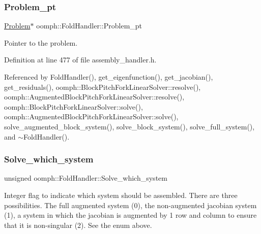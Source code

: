 \mbox{\label{classoomph_1_1FoldHandler_a2bd14323ca059b1aaef045cb9cc4013b}} 
\subsubsection{\texorpdfstring{Problem\+\_\+pt}{Problem\_pt}}
{\footnotesize\ttfamily \hyperlink{classoomph_1_1Problem}{Problem}$\ast$ oomph\+::\+Fold\+Handler\+::\+Problem\+\_\+pt\hspace{0.3cm}{\ttfamily [private]}}



Pointer to the problem. 



Definition at line 477 of file assembly\+\_\+handler.\+h.



Referenced by Fold\+Handler(), get\+\_\+eigenfunction(), get\+\_\+jacobian(), get\+\_\+residuals(), oomph\+::\+Block\+Pitch\+Fork\+Linear\+Solver\+::resolve(), oomph\+::\+Augmented\+Block\+Pitch\+Fork\+Linear\+Solver\+::resolve(), oomph\+::\+Block\+Pitch\+Fork\+Linear\+Solver\+::solve(), oomph\+::\+Augmented\+Block\+Pitch\+Fork\+Linear\+Solver\+::solve(), solve\+\_\+augmented\+\_\+block\+\_\+system(), solve\+\_\+block\+\_\+system(), solve\+\_\+full\+\_\+system(), and $\sim$\+Fold\+Handler().

\mbox{\label{classoomph_1_1FoldHandler_a76ecb78ebc1d48e5511b70660953f02d}} 
\subsubsection{\texorpdfstring{Solve\+\_\+which\+\_\+system}{Solve\_which\_system}}
{\footnotesize\ttfamily unsigned oomph\+::\+Fold\+Handler\+::\+Solve\+\_\+which\+\_\+system\hspace{0.3cm}{\ttfamily [private]}}



Integer flag to indicate which system should be assembled. There are three possibilities. The full augmented system (0), the non-\/augmented jacobian system (1), a system in which the jacobian is augmented by 1 row and column to ensure that it is non-\/singular (2). See the enum above. 



